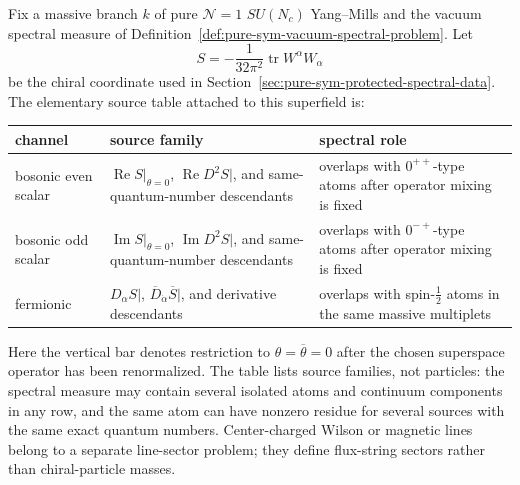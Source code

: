 \begin{definition}
\label{def:pure-sym-channel-source-family}
Fix a massive branch \(k\) of pure \(\mathcal N=1\) \(SU(N_c)\) Yang--Mills
and the vacuum spectral measure of
Definition~\ref{def:pure-sym-vacuum-spectral-problem}.  Let
\[
  S=-\frac{1}{32\pi^2}\operatorname{tr}W^\alpha W_\alpha
\]
be the chiral coordinate used in
Section~\ref{sec:pure-sym-protected-spectral-data}.  The elementary source
table attached to this superfield is:
\begin{center}
\small
\begin{tabular}{p{}|p{}|p{}}
\textbf{channel} & \textbf{source family} & \textbf{spectral role}\\
\hline
bosonic even scalar &
  \(\operatorname{Re} S|_{\theta=0}\), \(\operatorname{Re}D^2S|\), and
  same-quantum-number descendants &
  overlaps with \(0^{++}\)-type atoms after operator mixing is fixed\\
bosonic odd scalar &
  \(\operatorname{Im} S|_{\theta=0}\), \(\operatorname{Im}D^2S|\), and
  same-quantum-number descendants &
  overlaps with \(0^{-+}\)-type atoms after operator mixing is fixed\\
fermionic &
  \(D_\alpha S|\), \(\overline D_{\dot\alpha}\overline S|\), and
  derivative descendants &
  overlaps with spin-\(\frac12\) atoms in the same massive multiplets\\
\end{tabular}
\end{center}
Here the vertical bar denotes restriction to \(\theta=\overline\theta=0\) after
the chosen superspace operator has been renormalized.  The table lists source
families, not particles: the spectral measure may contain several
isolated atoms and continuum components in any row, and the same atom can have
nonzero residue for several sources with the same exact quantum numbers.
Center-charged Wilson or magnetic lines belong to a separate line-sector
problem; they define flux-string sectors rather than chiral-particle masses.
\end{definition}


